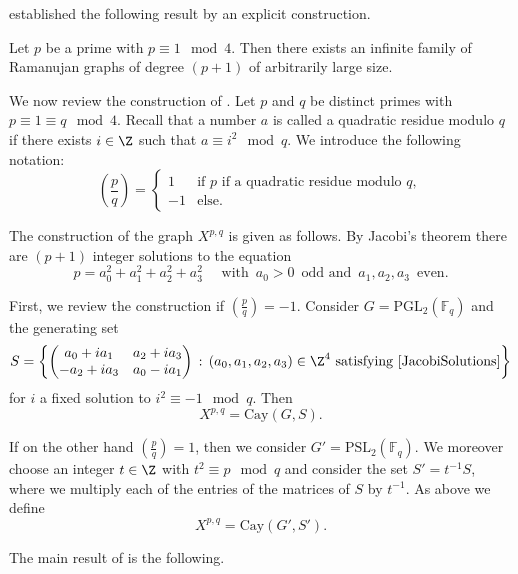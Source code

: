 \cite{LubotzkyPhillipsSarnak1988} established the following result by an explicit construction.

\begin{theorem}
	Let $p$ be a prime with $p \equiv 1 \mod 4$. Then there exists an infinite family of Ramanujan graphs of degree $(p + 1)$ of arbitrarily large size. 
\end{theorem}

We now review the construction of \cite{LubotzkyPhillipsSarnak1988}. Let $p$ and $q$ be distinct primes with $p \equiv 1 \equiv q \mod 4$. Recall that a number $a$ is called a quadratic residue modulo $q$ if there exists $i \in \Z$ such that $a \equiv i^2 \mod q$. We introduce the following notation:
$$\genfrac{(}{)}{}{}{p}{q} = \begin{cases}
1 & \text{if } p \text{ if a quadratic residue modulo } q,\\
-1& \text{else.}
\end{cases}$$

The construction of the graph $X^{p,q}$ is given as follows. By Jacobi's theorem there are $(p + 1)$ integer solutions to the equation 
\begin{equation}\label{JacobiSolutions}
p = a_0^2 + a_1^2 + a_2^2 + a_3^2 \quad \text{ with } \, a_0 > 0 \, \text{  odd and } \, a_1,a_2,a_3 \, \text{ even.}
\end{equation}


First, we review the construction if $\genfrac{(}{)}{}{}{p}{q} = -1$. Consider $G = \mathrm{PGL}_2(\mathbb{F}_q)$ and the generating set $$S = \left\{ \begin{pmatrix}
a_0 + i a_1 & a_2 + i a_3 \\-a_2 + ia_3 & a_0 - i a_1
\end{pmatrix} \,:\, (a_0,a_1,a_2,a_3) \in \Z^4 \text{ satisfying } \eqref{JacobiSolutions}  \right\}$$ for $i$ a fixed solution to $i^2 \equiv -1 \mod q$. Then $$X^{p,q} = \mathrm{Cay}(G,S).$$

If on the other hand $\genfrac{(}{)}{}{}{p}{q} = 1$, then we consider $G' = \mathrm{PSL}_2(\mathbb{F}_q)$. We moreover choose an integer $t \in \Z$ with $t^2 \equiv p \mod q$ and consider the set $S' = t^{-1}S$, where we multiply each of the entries of the matrices of $S$ by $t^{-1}$. As above we define $$X^{p,q} = \mathrm{Cay}(G',S').$$

The main result of \cite{LubotzkyPhillipsSarnak1988} is the following.

